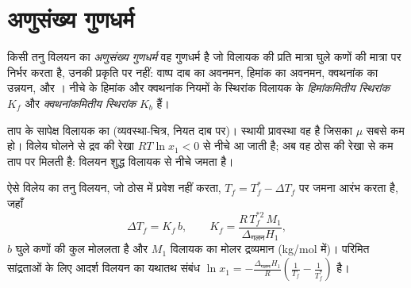 \section{अणुसंख्य गुणधर्म}

\begin{definition}[अणुसंख्य गुणधर्म]\label{def:b2:chemical-potential:colligative}
किसी तनु विलयन का \emph{अणुसंख्य गुणधर्म} वह
गुणधर्म है जो विलायक की प्रति मात्रा घुले कणों की मात्रा पर निर्भर करता है,
उनकी प्रकृति पर नहीं: वाष्प दाब का अवनमन, हिमांक का अवनमन,
क्वथनांक का उन्नयन, और । नीचे के हिमांक और क्वथनांक
नियमों के स्थिरांक विलायक के \emph{हिमांकमितीय स्थिरांक} $K_f$
और \emph{क्वथनांकमितीय स्थिरांक} $K_b$
हैं।
\end{definition}

\begin{omfigure}

{\small ताप के सापेक्ष विलायक का  (व्यवस्था-चित्र,
नियत दाब पर)। स्थायी प्रावस्था वह है जिसका $\mu$ सबसे कम हो। विलेय घोलने से
द्रव की रेखा $RT\ln x_1 < 0$ से नीचे आ जाती है; अब वह ठोस की रेखा से
कम ताप पर मिलती है: विलयन शुद्ध विलायक से नीचे जमता है।}
\end{omfigure}

\begin{theorem}[हिमांक का अवनमन]\label{thm:b2:chemical-potential:cryoscopy}
ऐसे विलेय का तनु विलयन, जो ठोस में प्रवेश नहीं करता,
$T_f = T_f^* - \Delta T_f$ पर जमना आरंभ करता है, जहाँ
\[
  \Delta T_f = K_f\,b, \qquad K_f = \frac{R\,T_f^{*2}\,M_1}{\Delta_{\text{गलन}}H_1} ,
\]
$b$ घुले कणों की कुल मोललता है और $M_1$ विलायक का मोलर
द्रव्यमान (\unit{kg/mol} में)। परिमित सांद्रताओं के लिए आदर्श विलयन का यथातथ
संबंध $\ln x_1 = -\frac{\Delta_{\text{गलन}}H_1}{R}
\left(\frac{1}{T_f} - \frac{1}{T_f^*}\right)$ है।
\end{theorem}

